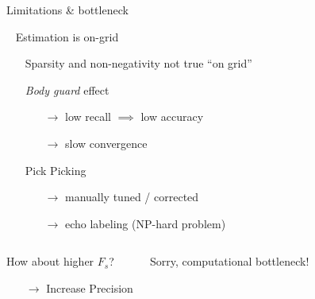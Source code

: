 \begin{frame}{Limitations \& bottleneck  \hfill\faPalette}

    \begin{block}{\faExclamationCircle~ Estimation is on-grid}

        \vspace{-2mm}
        \begin{itemize}
            \item[\faTh] Sparsity and non-negativity not true ``on grid''

            \item[\faUsers] \emph{Body guard} effect \cite{duval2017sparse}
            \begin{itemize}
                \item[$\rightarrow$] low recall $\implies$ low accuracy %
                \item[$\rightarrow$] slow convergence %
            \end{itemize}
            \item[\faSearchPlus] Pick Picking
            \begin{itemize}
                \item[$\rightarrow$] manually tuned / corrected
                \item[$\rightarrow$] echo labeling (NP-hard problem)
            \end{itemize}
        \end{itemize}
    \end{block}

    \begin{columns}[onlytextwidth]

        \begin{block}{How about higher $F_s$?}

            \vspace{-2mm}
            \begin{itemize}
                \item[$\rightarrow$] Increase Precision
            \end{itemize}
        \end{block}

        \begin{block}{Sorry, computational bottleneck!}


\end{block}
\end{columns}
\end{frame}
